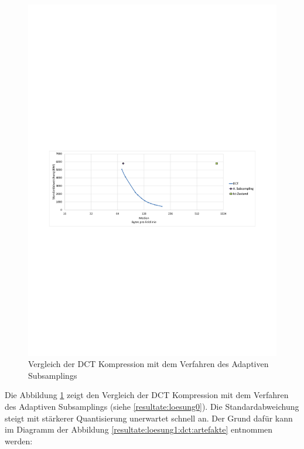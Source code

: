 \begin{figure}[!htbp]
	\center
	\includegraphics[trim = 1.8cm 11.5cm 1.8cm 13cm, clip=true,width=1\textwidth,keepaspectratio]{./pictures/resultate/loesung1/loesung1-0/loesung1_0.pdf}
	\caption{Vergleich der DCT Kompression mit dem Verfahren des Adaptiven Subsamplings}
	\label{resultate:loesung1:dct:resultate}
\end{figure}
Die Abbildung \ref{resultate:loesung1:dct:resultate} zeigt den Vergleich der DCT Kompression mit dem Verfahren des Adaptiven Subsamplings (siehe \ref{resultate:loesung0}). Die Standardabweichung steigt mit stärkerer Quantisierung unerwartet schnell an. Der Grund dafür kann im Diagramm der Abbildung \ref{resultate:loesung1:dct:artefakte} entnommen werden:

